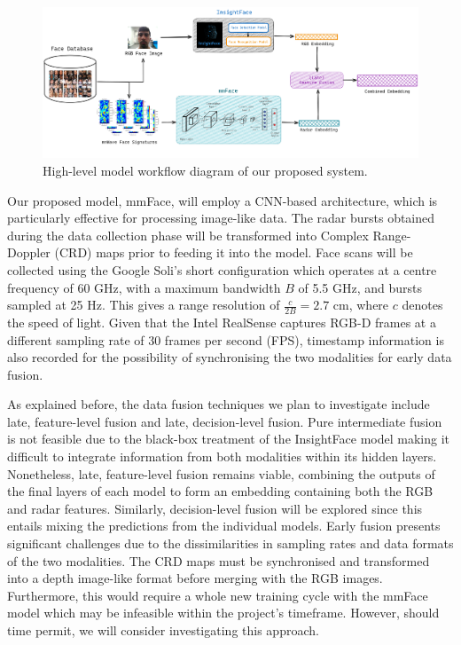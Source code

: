 \documentclass{interim}
\begin{document}
\begin{figure}[h!]
    \vspace{-0.4cm}
    \centering
    \includegraphics[width=1\textwidth]{images/model_architecture.pdf}
    \vspace{-1.1cm}
    \caption{High-level model workflow diagram of our proposed system.}
    \vspace{-2cm}
    \label{fig:model_architecture}
\end{figure}

\newpage
Our proposed model, mmFace, will employ a CNN-based architecture, which is particularly effective for processing image-like data. The radar bursts obtained during the data collection phase will be transformed into Complex Range-Doppler (CRD) maps \cite{lien2016soli,hayashi2021radarnet} prior to feeding it into the model. Face scans will be collected using the Google Soli's short configuration which operates at a centre frequency of 60 GHz, with a maximum bandwidth $B$ of 5.5 GHz, and bursts sampled at 25 Hz. This gives a range resolution of $\frac{c}{2B} = 2.7$ cm, where $c$ denotes the speed of light. Given that the Intel RealSense captures RGB-D frames at a different sampling rate of 30 frames per second (FPS), timestamp information is also recorded for the possibility of synchronising the two modalities for early data fusion.

As explained before, the data fusion techniques we plan to investigate include late, feature-level fusion and late, decision-level fusion. Pure intermediate fusion is not feasible due to the black-box treatment of the InsightFace model making it difficult to integrate information from both modalities within its hidden layers. Nonetheless, late, feature-level fusion remains viable, combining the outputs of the final layers of each model to form an embedding containing both the RGB and radar features. Similarly, decision-level fusion will be explored since this entails mixing the predictions from the individual models. Early fusion presents significant challenges due to the dissimilarities in sampling rates and data formats of the two modalities. The CRD maps must be synchronised and transformed into a depth image-like format before merging with the RGB images. Furthermore, this would require a whole new training cycle with the mmFace model which may be infeasible within the project's timeframe. However, should time permit, we will consider investigating this approach.
\end{document}
